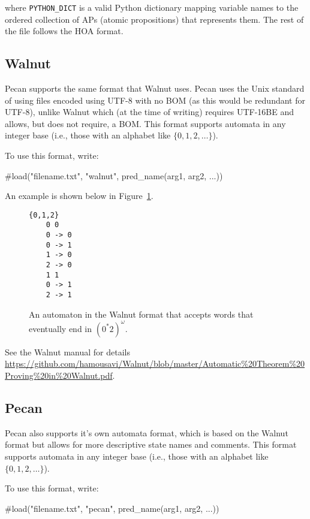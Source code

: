 where \lstinline{PYTHON_DICT} is a valid Python dictionary mapping variable names to the ordered collection of APs (atomic propositions) that represents them.
The rest of the file follows the HOA format.

\subsection{Walnut}

Pecan supports the same format that Walnut \cite{walnut} uses.
Pecan uses the Unix standard of using files encoded using UTF-8 with no BOM (as this would be redundant for UTF-8), unlike Walnut which (at the time of writing) requires UTF-16BE and allows, but does not require, a BOM.
This format supports automata in any integer base (i.e., those with an alphabet like $\{0,1,2,\ldots\}$).

To use this format, write:
\begin{pecan}
#load("filename.txt", "walnut", pred_name(arg1, arg2, ...))
\end{pecan}

An example is shown below in Figure~\ref{fig:example-walnut-aut}.

\begin{figure}
    \centering
    \begin{lstlisting}[basicstyle=\normalsize\ttfamily]
    {0,1,2}
    0 0
    0 -> 0
    0 -> 1
    1 -> 0
    2 -> 0
    1 1
    0 -> 1
    2 -> 1
    \end{lstlisting}
    \caption{An automaton in the Walnut format that accepts words that eventually end in $(0^* 2)^{\omega}$.}
    \label{fig:example-walnut-aut}
\end{figure}

See the Walnut manual for details \url{https://github.com/hamousavi/Walnut/blob/master/Automatic\%20Theorem\%20Proving\%20in\%20Walnut.pdf}.

\subsection{Pecan}

Pecan also supports it's own automata format, which is based on the Walnut format but allows for more descriptive state names and comments.
This format supports automata in any integer base (i.e., those with an alphabet like $\{0,1,2,\ldots\}$).

To use this format, write:
\begin{pecan}
#load("filename.txt", "pecan", pred_name(arg1, arg2, ...))
\end{pecan}

